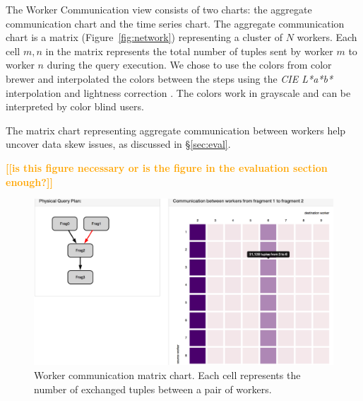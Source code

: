 \documentclass{chi2009}
\newcommand{\todo}[1]{\textsf{\textbf{\textcolor{Orange}{[[#1]]}}}}
\begin{document}
The Worker Communication view consists of two charts: the aggregate communication
chart and the time series chart. The aggregate communication chart is a matrix (Figure~\ref{fig:network}) representing
a cluster of $N$ workers. Each cell $m,n$ in the matrix represents the total number of tuples sent
by worker $m$ to worker $n$ during the query execution. We chose to use the colors from color brewer\cite{harrower2003colorbrewer} and interpolated the colors between the steps using the \emph{CIE L*a*b*} interpolation and lightness correction \cite{chromajsaisch}. The colors work in grayscale and can be interpreted by color blind users.

The matrix chart representing aggregate communication between workers help uncover data skew
issues, as discussed in \S \ref{sec:eval}.


\todo{is this figure necessary or is the figure in the evaluation section enough?}

\begin{figure}[!ht]
  \includegraphics[width=\columnwidth]{images/networkVis1}
  \caption{Worker communication matrix chart. Each cell represents the number of exchanged tuples between a
  pair of workers.}
  \label{fig:matrix}
\end{figure}
\end{document}
